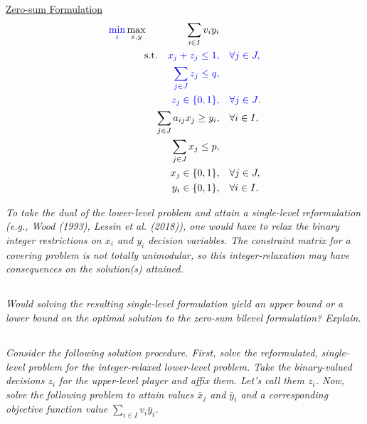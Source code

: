 \documentclass[12pt]{amsart}
\begin{document}
\begin{center}
\begin{minipage}{0.75\linewidth}
	
	\underline{Zero-sum Formulation}
	\begin{align*}
		{\color{blue}\min_z}\max_{x,y} \qquad\qquad \sum_{i\in I} v_iy_i& \\
		\text{s.t.}\quad
		{\color{blue} x_j+z_j \leq 1,}& \quad {\color{blue}\forall j\in J,}\\
		{\color{blue} \sum_{j\in J}z_j\leq q,}&  \\
		{\color{blue} z_j\in \{0,1\},}& {\color{blue}\quad\forall j\in J}.  \\
		\sum_{j\in J} a_{ij}x_j \geq y_i,& \quad \forall i\in I, \\
		\sum_{j\in J} x_j \leq p,& \\
		x_j \in \{0,1\},& \quad \forall j\in J, \\
		y_i \in \{0,1\},& \quad \forall i\in I.
	\end{align*}
	
\textit{To take the dual of the lower-level problem and attain a single-level reformulation (e.g.,
	Wood (1993), Lessin et al. (2018)), one would have to relax the binary integer restrictions
	on $x_i$ and $y_i$ decision variables. The constraint matrix for a covering problem is not totally
	unimodular, so this integer-relaxation may have consequences on the solution(s) attained.}

\end{minipage}
\end{center}		

\subsection{}
\textit{Would solving the resulting single-level formulation yield an upper bound or a lower bound
on the optimal solution to the zero-sum bilevel formulation? Explain.}


\subsection{}
\textit{Consider the following solution procedure. First, solve the reformulated, single-level
	problem for the integer-relaxed lower-level problem. Take the binary-valued decisions $z_i$
	for the upper-level player and affix them. Let’s call them $z_i$. Now, solve the following
	problem to attain values $\bar x_j$ and $\bar y_i$ and a corresponding objective function 
	value $\sum_{i\in I}v_i\bar y_i$.}
\end{document}
